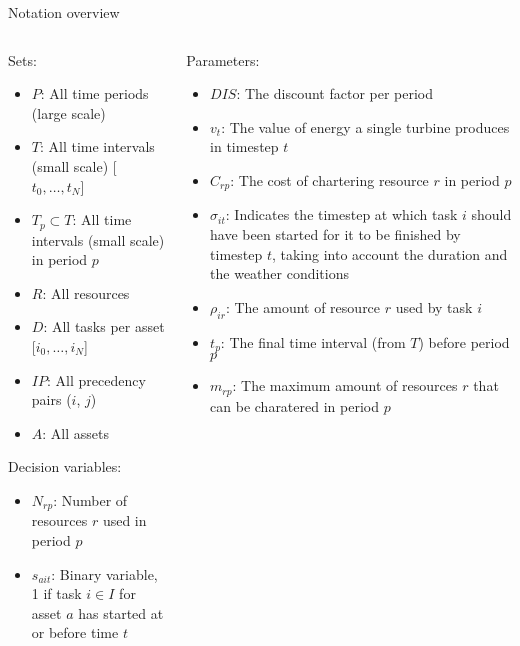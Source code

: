 \documentclass{beamer}
\begin{document}
\begin{frame}{Notation overview}
\scriptsize

\begin{columns}
\begin{column}{.48\textwidth}
Sets:
\begin{itemize}
\item $P$: All time periods (large scale)
\item $T$: All time intervals (small scale) [$t_0, \dots , t_N$]
\item $T_p \subset T$: All time intervals (small scale) in period $p$
\item $R$: All resources
\item $D$:  All tasks per asset [$i_0, \dots , i_N$]
\item $IP$: All precedency pairs ($i$, $j$)
\item $A$: All assets
\end{itemize}

Decision variables:
\begin{itemize}
\item $N_{rp}$: Number of resources $r$ used in period $p$
\item $s_{ait}$: Binary variable, 1 if task $i \in I$ for asset $a$ has started at or before time $t$
\end{itemize}
\end{column}

\hfill

\begin{column}{.48\textwidth}
Parameters:
\begin{itemize}
\item $DIS$: The discount factor per period
\item $v_t$: The value of energy a single turbine produces in timestep $t$
\item $C_{rp}$: The cost of chartering resource $r$ in period $p$
\item $\sigma_{it}$: Indicates the timestep at which task $i$ should have been started for it to be finished by timestep $t$, taking into account the duration and the weather conditions
\item $\rho_{ir}$: The amount of resource $r$ used by task $i$
\item $t_p$: The final time interval (from $T$) before period $p$
\item $m_{rp}$: The maximum amount of resources $r$ that can be charatered in period $p$
\end{itemize}
\end{column}
\end{columns}

\end{frame}
\end{document}

